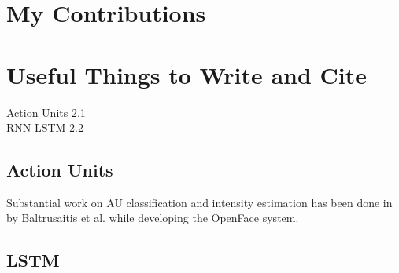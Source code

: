 \pagebreak

\section{My Contributions} \label{contrib}


\section{Useful Things to Write and Cite}
Action Units \ref{au} \\
RNN LSTM \ref{lstm} \\

\subsection{Action Units} \label{au}
Substantial work on AU classification and intensity estimation has been done in \cite{Baltru2015} by Baltrusaitis et al. while developing the OpenFace \cite{Baltru2016} system. 


\pagebreak

\subsection{LSTM} \label{lstm}